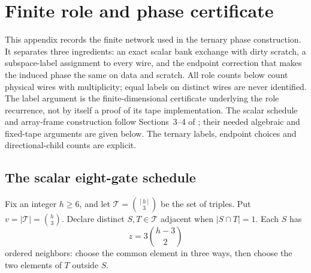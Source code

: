 \section{Finite role and phase certificate}\label{app:roles}

This appendix records the finite network used in the ternary phase construction. It separates three ingredients: an exact scalar bank exchange with dirty scratch, a subspace-label assignment to every wire, and the endpoint correction that makes the induced phase the same on data and scratch. All role counts below count physical wires with multiplicity; equal labels on distinct wires are never identified. The label argument is the finite-dimensional certificate underlying the role recurrence, not by itself a proof of its tape implementation. The scalar schedule and array-frame construction follow Sections~3--4 of \cite{OpenAI26}; their needed algebraic and fixed-tape arguments are given below. The ternary labels, endpoint choices and directional-child counts are explicit.

\subsection{The scalar eight-gate schedule}

Fix an integer $h\ge 6$, and let $\mathcal T=\binom{[h]}{3}$ be the set of triples. Put $v=|\mathcal T|=\binom h3$. Declare distinct $S,T\in\mathcal T$ adjacent when $|S\cap T|=1$. Each $S$ has
\[
 z=3\binom{h-3}{2}
\]
ordered neighbors: choose the common element in three ways, then choose the two elements of $T$ outside $S$.

